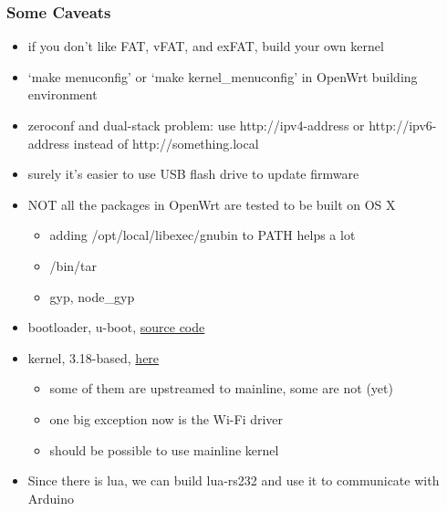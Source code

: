 \documentclass{beamer}
\begin{document}
\begin{frame}
  \frametitle{Some Caveats}
  \begin{itemize}
  \item if you don't like FAT, vFAT, and exFAT, build your own kernel
  \item `make menuconfig' or `make kernel\_menuconfig' in OpenWrt building environment
  \item zeroconf and dual-stack problem: use http://ipv4-address or http://ipv6-address instead of http://something.local
  \item surely it's easier to use USB flash drive to update firmware
  \item NOT all the packages in OpenWrt are tested to be built on OS X
  \begin{itemize}
  \item adding /opt/local/libexec/gnubin to PATH helps a lot
  \item /bin/tar
  \item gyp, node\_gyp
  \end{itemize}
  \end{itemize}
\end{frame}

\begin{frame}
  \begin{itemize}
  \item bootloader, u-boot, \href{https://github.com/MediaTek-Labs/linkit-smart-7688-uboot}{source code}
  \item kernel, 3.18-based, \href{http://git.openwrt.org/15.05/openwrt.git?p=15.05/openwrt.git;a=tree;f=target/linux/ramips/patches-3.18;hb=HEAD}{here}
    \begin{itemize}
    \item some of them are upstreamed to mainline, some are not (yet)
    \item one big exception now is the Wi-Fi driver
    \item should be possible to use mainline kernel
    \end{itemize}
  \item Since there is lua, we can build lua-rs232 and use it to communicate with Arduino
  \end{itemize}
\end{frame}
\end{document}
